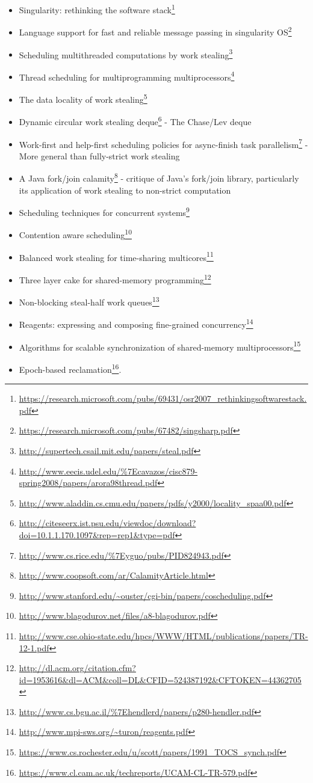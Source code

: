\documentclass[a4paper,]{book}
\renewcommand{\href}[2]{#2\footnote{\url{#1}}}
\providecommand{\tightlist}{%
  \setlength{\itemsep}{0pt}\setlength{\parskip}{0pt}}
\begin{document}
\begin{itemize}
\tightlist
\item
  \href{https://research.microsoft.com/pubs/69431/osr2007_rethinkingsoftwarestack.pdf}{Singularity:
  rethinking the software stack}
\item
  \href{https://research.microsoft.com/pubs/67482/singsharp.pdf}{Language
  support for fast and reliable message passing in singularity OS}
\item
  \href{http://supertech.csail.mit.edu/papers/steal.pdf}{Scheduling
  multithreaded computations by work stealing}
\item
  \href{http://www.eecis.udel.edu/\%7Ecavazos/cisc879-spring2008/papers/arora98thread.pdf}{Thread
  scheduling for multiprogramming multiprocessors}
\item
  \href{http://www.aladdin.cs.cmu.edu/papers/pdfs/y2000/locality_spaa00.pdf}{The
  data locality of work stealing}
\item
  \href{http://citeseerx.ist.psu.edu/viewdoc/download?doi=10.1.1.170.1097\&rep=rep1\&type=pdf}{Dynamic
  circular work stealing deque} - The Chase/Lev deque
\item
  \href{http://www.cs.rice.edu/\%7Eyguo/pubs/PID824943.pdf}{Work-first
  and help-first scheduling policies for async-finish task parallelism}
  - More general than fully-strict work stealing
\item
  \href{http://www.coopsoft.com/ar/CalamityArticle.html}{A Java
  fork/join calamity} - critique of Java's fork/join library,
  particularly its application of work stealing to non-strict
  computation
\item
  \href{http://www.stanford.edu/~ouster/cgi-bin/papers/coscheduling.pdf}{Scheduling
  techniques for concurrent systems}
\item
  \href{http://www.blagodurov.net/files/a8-blagodurov.pdf}{Contention
  aware scheduling}
\item
  \href{http://www.cse.ohio-state.edu/hpcs/WWW/HTML/publications/papers/TR-12-1.pdf}{Balanced
  work stealing for time-sharing multicores}
\item
  \href{http://dl.acm.org/citation.cfm?id=1953616\&dl=ACM\&coll=DL\&CFID=524387192\&CFTOKEN=44362705}{Three
  layer cake for shared-memory programming}
\item
  \href{http://www.cs.bgu.ac.il/\%7Ehendlerd/papers/p280-hendler.pdf}{Non-blocking
  steal-half work queues}
\item
  \href{http://www.mpi-sws.org/~turon/reagents.pdf}{Reagents: expressing
  and composing fine-grained concurrency}
\item
  \href{https://www.cs.rochester.edu/u/scott/papers/1991_TOCS_synch.pdf}{Algorithms
  for scalable synchronization of shared-memory multiprocessors}
\item
  \href{https://www.cl.cam.ac.uk/techreports/UCAM-CL-TR-579.pdf}{Epoch-based
  reclamation}.
\end{itemize}
\end{document}
